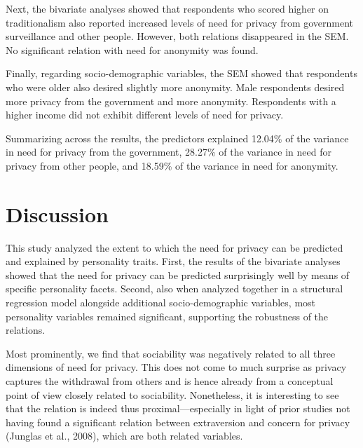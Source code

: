 \documentclass[man,floatsintext]{apa6}
\begin{document}
Next, the bivariate analyses showed that respondents who scored higher on traditionalism also reported increased levels of need for privacy from government surveillance and other people. However, both relations disappeared in the SEM. No significant relation with need for anonymity was found.

Finally, regarding socio-demographic variables, the SEM showed that respondents who were older also desired slightly more anonymity. Male respondents desired more privacy from the government and more anonymity. Respondents with a higher income did not exhibit different levels of need for privacy.

Summarizing across the results, the predictors explained 12.04\% of the variance in need for privacy from the government, 28.27\% of the variance in need for privacy from other people, and 18.59\% of the variance in need for anonymity.

\hypertarget{discussion}{%
\section{Discussion}\label{discussion}}

This study analyzed the extent to which the need for privacy can be predicted and explained by personality traits. First, the results of the bivariate analyses showed that the need for privacy can be predicted surprisingly well by means of specific personality facets. Second, also when analyzed together in a structural regression model alongside additional socio-demographic variables, most personality variables remained significant, supporting the robustness of the relations.

Most prominently, we find that sociability was negatively related to all three dimensions of need for privacy. This does not come to much surprise as privacy captures the withdrawal from others and is hence already from a conceptual point of view closely related to sociability. Nonetheless, it is interesting to see that the relation is indeed thus proximal---especially in light of prior studies not having found a significant relation between extraversion and concern for privacy (Junglas et al., 2008), which are both related variables.
\end{document}
